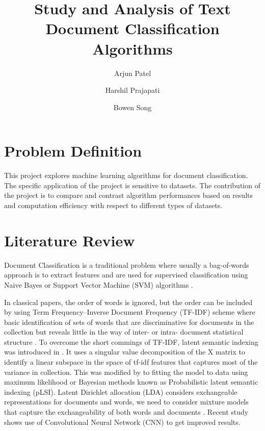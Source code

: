 \documentclass[10pt,twocolumn,letterpaper]{article}
\begin{document}
\title{Study and Analysis of Text Document Classification Algorithms}
\author[1]{Arjun Patel}
\author[1]{Harshil Prajapati}
\author[1]{Bowen Song}

\maketitle

\section{Problem Definition}
   This project explores machine learning algorithms for document classification. The specific application of the project is sensitive to datasets. The contribution of the project is to compare and contrast algorithm performances based on results and computation efficiency with respect to different types of datasets.


\section{Literature Review}
 Document Classification is a traditional problem where usually a bag-of-words approach is to extract features and are used for supervised classification using Naive Bayes or Support Vector Machine (SVM) algorithms \cite{sachan2018investigating}. 

In classical papers, the order of words is ignored, but the order can be included by using Term Frequency–Inverse Document Frequency (TF-IDF) scheme where basic identification of sets of words that are discriminative for documents in the collection but reveals little in the way of inter- or intra- document statistical structure \cite{maes1995agents}. To overcome the short commings of TF-IDF, latent semantic indexing was introduced in \cite{deerwester1990indexing}. It uses a singular value decomposition of the X matrix to identify a linear subspace in the space of tf-idf features that captures most of the variance in collection. This was modified by \cite{hofmann1999probabilistic} to fitting the model to data using maximum likelihood or Bayesian methods known as Probabilistic latent semantic indexing (pLSI). Latent Dirichlet allocation (LDA) considers exchangeable representations for documents and words, we need to consider mixture models that capture the exchangeability of both words and documents \cite{blei2003latent}. Recent study shows use of Convolutional Neural Network (CNN) \cite{kim2014convolutional} to get improved results. 
\end{document}
